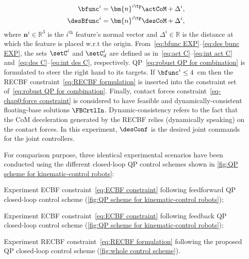 \begin{align}
\label{eq:bfunc EXP}\bfunc^i & = \bm{n}^{i\tp}\actCoM + \Delta^i,\\
\label{eq:des bunc EXP}\desBfunc^i & = \bm{n}^{i\tp}\desCoM + \Delta^i,
\end{align} 
where $\bm{n}^{i}\in\mathbb{R}^3$ is the $i^{\text{th}}$ feature's normal vector and $\Delta^i\in\mathbb{R}$ is the distance at which the feature is placed w.r.t the origin. From~\cref{eq:bfunc EXP}--\cref{eq:des bunc EXP}, 	the sets $\setC^i$ and $\setC_d^i$ are defined as in~\cref{eq:act C}--\cref{eq:int act C} and~\cref{eq:des C}--\cref{eq:int des C}, respectively. QP~\eqref{eq:robust QP for combination} is formulated to steer the right hand to its targets. If $\bfunc^i\leq 4$~cm then the RECBF constraint~\cref{eq:RECBF formulation} is inserted into the constraint set of~\cref{eq:robust QP for combination}. Finally, contact forces constraint~\cref{eq-chap0:force constraint} is considered to have feasible and dynamically-consistent floating-base solutions $\FBCrtlIn$. Dynamic-consistency refers to the fact that the CoM deceleration generated by the RECBF relies (dynamically speaking) on the contact forces. 
In this experiment, $\desConf$ is the desired joint commands  for the joint controllers.

For comparison purpose, three identical experimental scenarios have been conducted using the different closed-loop QP control schemes shown in \cref{fig:QP scheme for kinematic-control robots}:

 \begin{experiment}{Experiment}\label{exp-cha3:feedforward ECBF}
	 ECBF constraint~\eqref{eq:ECBF constraint} following feedforward QP closed-loop control scheme (\cref{fig:QP scheme for kinematic-control robots});
\end{experiment}
\begin{experiment}{Experiment}\label{exp-cha3:feedback ECBF}
	 ECBF constraint~\eqref{eq:ECBF constraint} following feedback QP closed-loop control scheme (\cref{fig:QP scheme for kinematic-control robots});
\end{experiment} 
\begin{experiment}{Experiment}\label{exp-cha3:RECBF}
	RECBF constraint~\cref{eq:RECBF formulation} following the proposed QP closed-loop control scheme (\cref{fig:whole control scheme}).
\end{experiment}



